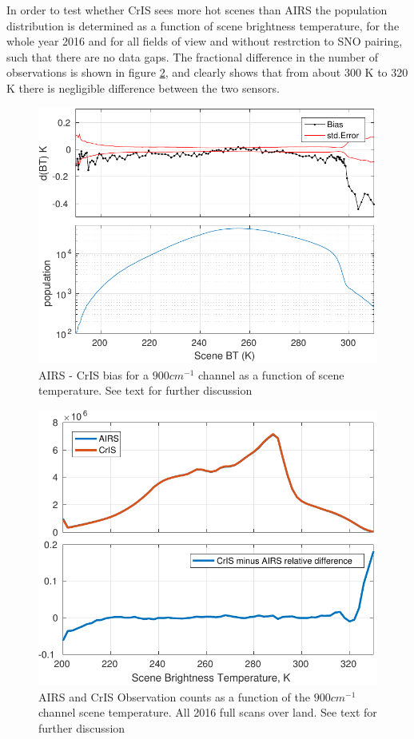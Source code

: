 \documentclass[11pt]{article}
\begin{document}
In order to test whether CrIS sees more hot scenes than AIRS the population distribution is determined as a function of scene brightness temperature, for the whole year 2016 and for all fields of view and without restrction to SNO pairing, such that there are no data gaps. The fractional difference in the number of observations is shown in figure \ref{fig:Y7}, and clearly shows that from about 300 K to 320 K there is negligible difference between the two sensors.  

\begin{figure}[htb]
\centering
\includegraphics[width=.6\linewidth]{./figs/AC_jplSNO_900wn_bias_vs_scene.pdf}
\caption{\label{fig:orgparagraph18}
  AIRS - CrIS bias for a $900 cm^{-1}$ channel as a function of scene temperature. See text for further discussion}
\label{fig:Y6}
\end{figure}

\begin{figure}[htb]
\centering
\includegraphics[width=.6\linewidth]{./figs/full_scan_land_2016_all_mod.pdf}
\caption{\label{fig:orgparagraph18}
  AIRS and CrIS Observation counts as a function of the $900 cm^{-1}$ channel scene temperature. All 2016 full scans over land. See text for further discussion}
\label{fig:Y7}
\end{figure}
\end{document}
